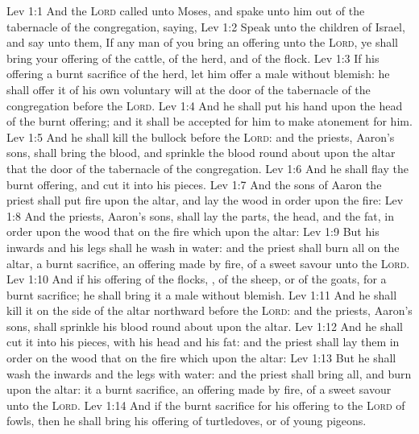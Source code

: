 \vs Lev 1:1 And the \textsc{Lord} called unto Moses, and spake unto him out of the tabernacle of the congregation, saying,
\vs Lev 1:2 Speak unto the children of Israel, and say unto them, If any man of you bring an offering unto the \textsc{Lord}, ye shall bring your offering of the cattle,  of the herd, and of the flock.
\vs Lev 1:3 If his offering  a burnt sacrifice of the herd, let him offer a male without blemish: he shall offer it of his own voluntary will at the door of the tabernacle of the congregation before the \textsc{Lord}.
\vs Lev 1:4 And he shall put his hand upon the head of the burnt offering; and it shall be accepted for him to make atonement for him.
\vs Lev 1:5 And he shall kill the bullock before the \textsc{Lord}: and the priests, Aaron's sons, shall bring the blood, and sprinkle the blood round about upon the altar that  the door of the tabernacle of the congregation.
\vs Lev 1:6 And he shall flay the burnt offering, and cut it into his pieces.
\vs Lev 1:7 And the sons of Aaron the priest shall put fire upon the altar, and lay the wood in order upon the fire:
\vs Lev 1:8 And the priests, Aaron's sons, shall lay the parts, the head, and the fat, in order upon the wood that  on the fire which  upon the altar:
\vs Lev 1:9 But his inwards and his legs shall he wash in water: and the priest shall burn all on the altar,  a burnt sacrifice, an offering made by fire, of a sweet savour unto the \textsc{Lord}.
\vs Lev 1:10 And if his offering  of the flocks, , of the sheep, or of the goats, for a burnt sacrifice; he shall bring it a male without blemish.
\vs Lev 1:11 And he shall kill it on the side of the altar northward before the \textsc{Lord}: and the priests, Aaron's sons, shall sprinkle his blood round about upon the altar.
\vs Lev 1:12 And he shall cut it into his pieces, with his head and his fat: and the priest shall lay them in order on the wood that  on the fire which  upon the altar:
\vs Lev 1:13 But he shall wash the inwards and the legs with water: and the priest shall bring  all, and burn  upon the altar: it  a burnt sacrifice, an offering made by fire, of a sweet savour unto the \textsc{Lord}.
\vs Lev 1:14 And if the burnt sacrifice for his offering to the \textsc{Lord}  of fowls, then he shall bring his offering of turtledoves, or of young pigeons.
